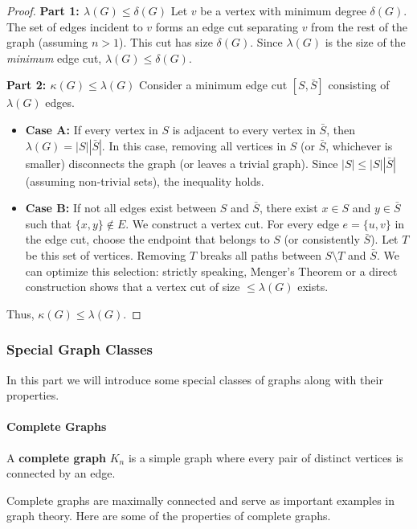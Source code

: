 \begin{proof}
\textbf{Part 1: $\lambda(G) \le \delta(G)$}
Let $v$ be a vertex with minimum degree $\delta(G)$. The set of edges incident to $v$ forms an edge cut separating $v$ from the rest of the graph (assuming $n > 1$). This cut has size $\delta(G)$. Since $\lambda(G)$ is the size of the \textit{minimum} edge cut, $\lambda(G) \le \delta(G)$.

\textbf{Part 2: $\kappa(G) \le \lambda(G)$}
Consider a minimum edge cut $[S, \bar{S}]$ consisting of $\lambda(G)$ edges.
\begin{itemize}
    \item \textbf{Case A:} If every vertex in $S$ is adjacent to every vertex in $\bar{S}$, then $\lambda(G) = |S||\bar{S}|$. In this case, removing all vertices in $S$ (or $\bar{S}$, whichever is smaller) disconnects the graph (or leaves a trivial graph). Since $|S| \le |S||\bar{S}|$ (assuming non-trivial sets), the inequality holds.
    \item \textbf{Case B:} If not all edges exist between $S$ and $\bar{S}$, there exist $x \in S$ and $y \in \bar{S}$ such that $\{x, y\} \notin E$. We construct a vertex cut. For every edge $e = \{u, v\}$ in the edge cut, choose the endpoint that belongs to $S$ (or consistently $\bar{S}$). Let $T$ be this set of vertices. Removing $T$ breaks all paths between $S \setminus T$ and $\bar{S}$. We can optimize this selection: strictly speaking, Menger's Theorem or a direct construction shows that a vertex cut of size $\le \lambda(G)$ exists.
\end{itemize}
Thus, $\kappa(G) \le \lambda(G)$.
\end{proof}

\subsubsection{Special Graph Classes}

In this part we will introduce some special classes of graphs along with their properties.

\paragraph{Complete Graphs}
\begin{definition}
A \textbf{complete graph} $K_n$ is a simple graph where every pair of distinct vertices is connected by an edge.
\end{definition}

Complete graphs are maximally connected and serve as important examples in graph theory. Here are some of the properties of complete graphs.

